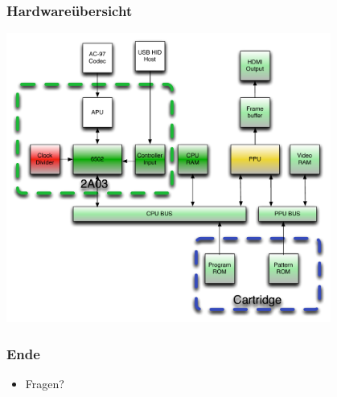 \documentclass{beamer}
\begin{document}
    \begin{frame}
        \frametitle{Hardwareübersicht}
        \includegraphics[width=0.8\textwidth]{img/system3.pdf}
    \end{frame}
    
   
    \begin{frame}
        \frametitle{Ende}
        \begin{itemize}
            \item{Fragen?}
        \end{itemize}
    \end{frame}
    
\end{document}
